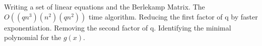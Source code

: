 
\noindent

Writing a set of linear equations and the Berlekamp Matrix. The $O((qn^3)(n^2)(qn^2))$ time algorithm. Reducing the first factor of q by faster exponentiation. Removing the second factor of q. Identifying the minimal polynomial for the $g(x)$.